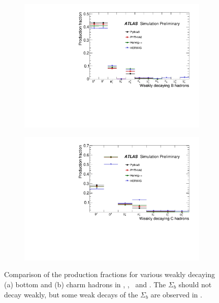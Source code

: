 \begin{figure}
\centering
\begin{subfigure}[]{0.5\textwidth}
\includegraphics[width=\textwidth]{evtgen/figures/EvtGen/h_bgroundtype.pdf}
\end{subfigure}
\begin{subfigure}[]{0.5\textwidth}
\includegraphics[width=\textwidth]{evtgen/figures/EvtGen/h_cgroundtype.pdf}
\end{subfigure}
\caption{Comparison of the production fractions for various 
weakly decaying (a) bottom and (b) charm hadrons in 
\PythiaE, \Pythia, \Herwigpp\  and \Herwig.
The $\Sigma_{b}$ should not decay weakly, but some weak decays of the $\Sigma_{b}$ are observed in 
\Herwig. 
}
\label{fig:prodfrac}
\end{figure}


